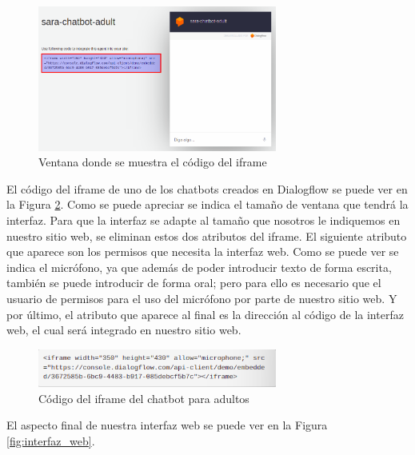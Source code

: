\begin{figure}[h]
\centering
\includegraphics[width=0.7\textwidth]{imagenes/07_Implementacion/dialogflow_iframe.png}
\caption{Ventana donde se muestra el código del iframe}
\label{fig:dialogflow_iframe}
\end{figure}

El código del iframe de uno de los chatbots creados en Dialogflow se puede ver en la Figura \ref{fig:codigo_iframe}. Como se puede apreciar se indica el tamaño de ventana que tendrá la interfaz. Para que la interfaz se adapte al tamaño que nosotros le indiquemos en nuestro sitio web, se eliminan estos dos atributos del iframe. El siguiente atributo que aparece son los permisos que necesita la interfaz web. Como se puede ver se indica el micrófono, ya que además de poder introducir texto de forma escrita, también se puede introducir de forma oral; pero para ello es necesario que el usuario de permisos para el uso del micrófono por parte de nuestro sitio web. Y por último, el atributo que aparece al final es la dirección al código de la interfaz web, el cual será integrado en nuestro sitio web.

\begin{figure}[h]
\centering
\includegraphics[width=0.7\textwidth]{imagenes/07_Implementacion/codigo_iframe.png}
\caption{Código del iframe del chatbot para adultos}
\label{fig:codigo_iframe}
\end{figure}

El aspecto final de nuestra interfaz web se puede ver en la Figura \ref{fig:interfaz_web}.

